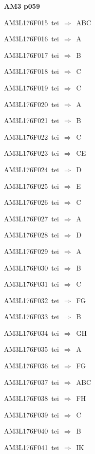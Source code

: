 \par\vfill\eject
{\bf\hfill AM3 p059\hfill\hbox{}}\par\bigskip
{\sixrm AM3L176F015\ {\sixit tei}\ }$\Rightarrow$\ ABC\par\smallskip
{\sixrm AM3L176F016\ {\sixit tei}\ }$\Rightarrow$\ A\par\smallskip
{\sixrm AM3L176F017\ {\sixit tei}\ }$\Rightarrow$\ B\par\smallskip
{\sixrm AM3L176F018\ {\sixit tei}\ }$\Rightarrow$\ C\par\smallskip
{\sixrm AM3L176F019\ {\sixit tei}\ }$\Rightarrow$\ C\par\smallskip
{\sixrm AM3L176F020\ {\sixit tei}\ }$\Rightarrow$\ A\par\smallskip
{\sixrm AM3L176F021\ {\sixit tei}\ }$\Rightarrow$\ B\par\smallskip
{\sixrm AM3L176F022\ {\sixit tei}\ }$\Rightarrow$\ C\par\smallskip
{\sixrm AM3L176F023\ {\sixit tei}\ }$\Rightarrow$\ CE\par\smallskip
{\sixrm AM3L176F024\ {\sixit tei}\ }$\Rightarrow$\ D\par\smallskip
{\sixrm AM3L176F025\ {\sixit tei}\ }$\Rightarrow$\ E\par\smallskip
{\sixrm AM3L176F026\ {\sixit tei}\ }$\Rightarrow$\ C\par\smallskip
{\sixrm AM3L176F027\ {\sixit tei}\ }$\Rightarrow$\ A\par\smallskip
{\sixrm AM3L176F028\ {\sixit tei}\ }$\Rightarrow$\ D\par\smallskip
{\sixrm AM3L176F029\ {\sixit tei}\ }$\Rightarrow$\ A\par\smallskip
{\sixrm AM3L176F030\ {\sixit tei}\ }$\Rightarrow$\ B\par\smallskip
{\sixrm AM3L176F031\ {\sixit tei}\ }$\Rightarrow$\ C\par\smallskip
{\sixrm AM3L176F032\ {\sixit tei}\ }$\Rightarrow$\ FG\par\smallskip
{\sixrm AM3L176F033\ {\sixit tei}\ }$\Rightarrow$\ B\par\smallskip
{\sixrm AM3L176F034\ {\sixit tei}\ }$\Rightarrow$\ GH\par\smallskip
{\sixrm AM3L176F035\ {\sixit tei}\ }$\Rightarrow$\ A\par\smallskip
{\sixrm AM3L176F036\ {\sixit tei}\ }$\Rightarrow$\ FG\par\smallskip
{\sixrm AM3L176F037\ {\sixit tei}\ }$\Rightarrow$\ ABC\par\smallskip
{\sixrm AM3L176F038\ {\sixit tei}\ }$\Rightarrow$\ FH\par\smallskip
{\sixrm AM3L176F039\ {\sixit tei}\ }$\Rightarrow$\ C\par\smallskip
{\sixrm AM3L176F040\ {\sixit tei}\ }$\Rightarrow$\ B\par\smallskip
{\sixrm AM3L176F041\ {\sixit tei}\ }$\Rightarrow$\ IK\par\smallskip

